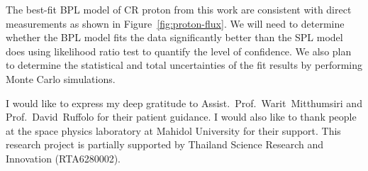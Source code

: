 The best-fit BPL model of CR proton from this work are consistent with direct
measurements as shown in Figure~\ref{fig:proton-flux}.
We will need to determine whether the BPL model fits the data significantly better
than the SPL model does using likelihood ratio test to quantify the level of
confidence. We also plan to determine the statistical and total uncertainties of
the fit results by performing Monte Carlo simulations. 


\par I would like to express my deep gratitude to 
Assist.~Prof.~Warit~Mitthumsiri and Prof.~David~Ruffolo for their patient guidance.
I would also like to thank people at the space physics laboratory at Mahidol University
for their support.
This research project is partially supported by Thailand Science Research
and Innovation (RTA6280002).
